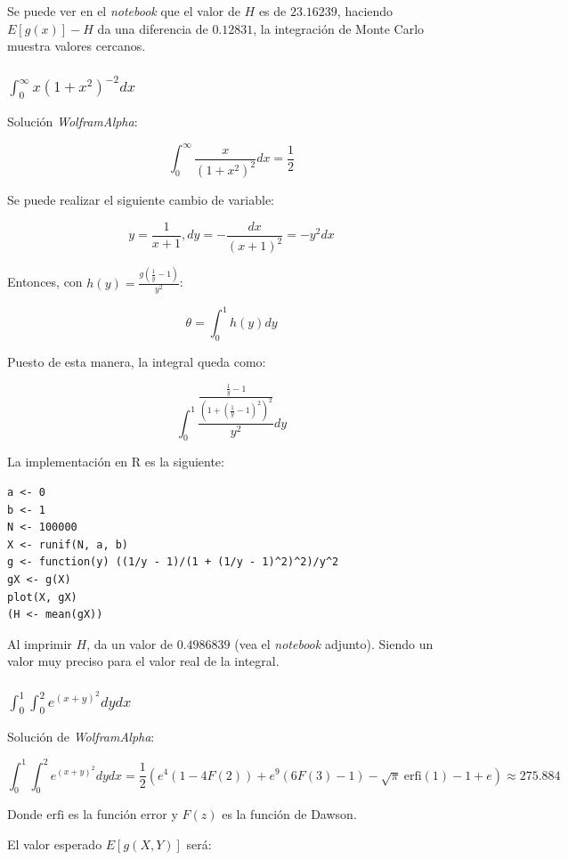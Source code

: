 \documentclass[12pt]{article}
\begin{document}
Se puede ver en el \textit{notebook} que el valor de $H$ es de $23.16239$, haciendo $E[g(x)] - H$ da una diferencia de $0.12831$, la integración de Monte Carlo muestra valores cercanos.

\subsubsection{$\int_{0}^{\infty} x(1 + x^{2})^{-2} dx$}

Solución \textit{WolframAlpha}:

\[
\int_{0}^{\infty} \frac{x}{(1 + x^{2})^{2}} dx = \frac{1}{2} 
\]

Se puede realizar el siguiente cambio de variable:

\[    
y = \frac{1}{x+1} , dy = - \frac{dx}{(x+1)^{2}} = -y^{2} dx
\]

Entonces, con $h(y) = \frac{g \left( \frac{1}{y} - 1\right) }{y^{2}}$:

\[
\theta = \int_{0}^{1} h(y) dy
\]

Puesto de esta manera, la integral queda como:

\[ 
\int_{0}^{1} \frac{\frac{ \frac{1}{y} - 1 }{ (1 + (\frac{1}{y} - 1)^{2} )^{2}}}{y^{2}} dy
\]

La implementación en \textsf{R} es la siguiente: 


\begin{lstlisting}
a <- 0
b <- 1
N <- 100000 
X <- runif(N, a, b)
g <- function(y) ((1/y - 1)/(1 + (1/y - 1)^2)^2)/y^2
gX <- g(X)
plot(X, gX)
(H <- mean(gX))
\end{lstlisting}

Al imprimir $H$, da un valor de $0.4986839$ (vea el \textit{notebook} adjunto). Siendo un valor muy preciso para el valor real de la integral.



\subsubsection{$\int_{0}^{1} \int_{0}^{2} e^{(x + y)^{2}} dydx$}

Solución de \textit{WolframAlpha}:

\[ 
\int_{0}^{1} \int_{0}^{2} e^{(x + y)^{2}} dydx = \frac{1}{2} (e^{4}(1 - 4F(2)) + e^{9} (6 F(3) - 1) - \sqrt{\pi} \ \mathrm{erfi}(1) - 1 + e  ) \approx 275.884
\]

Donde $\mathrm{erfi}$ es la función error y $F(z)$ es la función de Dawson.

El valor esperado $E[g(X, Y)]$ será:
\end{document}
